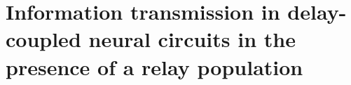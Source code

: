 \documentclass[../main.tex]{subfiles}
\begin{document}
\chapter[Information transmission in delay-coupled neural circuits]{Information transmission in delay-coupled neural circuits in the presence of a relay population}





\printbibliography
\end{document}
